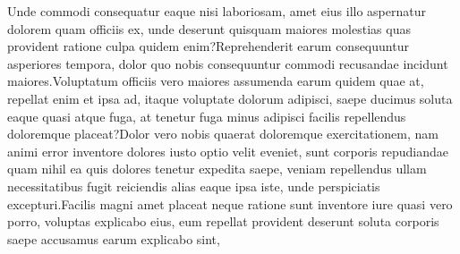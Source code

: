 \documentclass[letterpaper, table]{article} %
\begin{document}
Unde commodi consequatur eaque nisi laboriosam, amet eius illo aspernatur dolorem quam officiis ex, unde deserunt quisquam maiores molestias quas provident ratione culpa quidem enim?Reprehenderit earum consequuntur asperiores tempora, dolor quo nobis consequuntur commodi recusandae incidunt maiores.Voluptatum officiis vero maiores assumenda earum quidem quae at, repellat enim et ipsa ad, itaque voluptate dolorum adipisci, saepe ducimus soluta eaque quasi atque fuga, at tenetur fuga minus adipisci facilis repellendus doloremque placeat?Dolor vero nobis quaerat doloremque exercitationem, nam animi error inventore dolores iusto optio velit eveniet, sunt corporis repudiandae quam nihil ea quis dolores tenetur expedita saepe, veniam repellendus ullam necessitatibus fugit reiciendis alias eaque ipsa iste, unde perspiciatis excepturi.Facilis magni amet placeat neque ratione sunt inventore iure quasi vero porro, voluptas explicabo eius, eum repellat provident deserunt soluta corporis saepe accusamus earum explicabo sint,

\end{document}
